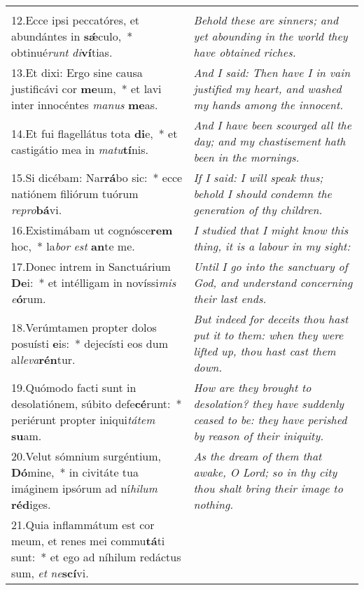 \begin{longtable}{@{\hskip0pt} p{10cm} | p{6cm} @{\hskip0pt}}
{}\\
12.\enspace Ecce ipsi peccatóres, et abundántes in \textbf{s\'{\ae}}culo,~* obtinué\textit{runt} \textit{di}\textbf{ví}tias.
 & \textit{\small Behold these are sinners; and yet abounding in the world they have obtained riches.
}\\
13.\enspace Et dixi: Ergo sine causa justificávi cor \textbf{me}um,~* et lavi inter innocéntes \textit{ma}\textit{nus} \textbf{me}as.
 & \textit{\small And I said: Then have I in vain justified my heart, and washed my hands among the innocent.
}\\
14.\enspace Et fui flagellátus tota \textbf{di}e,~* et castigátio mea in \textit{ma}\textit{tu}\textbf{tí}nis.
 & \textit{\small And I have been scourged all the day; and my chastisement hath been in the mornings.
}\\
15.\enspace Si dicébam: Nar\textbf{rá}bo sic:~* ecce natiónem filiórum tuórum \textit{re}\textit{pro}\textbf{bá}vi.
 & \textit{\small If I said: I will speak thus; behold I should condemn the generation of thy children.
}\\
16.\enspace Existimábam ut cognósce\textbf{rem} hoc,~* la\textit{bor} \textit{est} \textbf{an}te me.
 & \textit{\small I studied that I might know this thing, it is a labour in my sight:
}\\
17.\enspace Donec intrem in Sanctuárium \textbf{De}i:~* et intélligam in novíssi\textit{mis} \textit{e}\textbf{ó}rum.
 & \textit{\small Until I go into the sanctuary of God, and understand concerning their last ends.
}\\
18.\enspace Verúmtamen propter dolos posuísti \textbf{e}is:~* dejecísti eos dum al\textit{le}\textit{va}\textbf{rén}tur.
 & \textit{\small But indeed for deceits thou hast put it to them: when they were lifted up, thou hast cast them down.
}\\
19.\enspace Quómodo facti sunt in desolatiónem, súbito defe\textbf{cé}runt:~* periérunt propter iniqui\textit{tá}\textit{tem} \textbf{su}am.
 & \textit{\small How are they brought to desolation? they have suddenly ceased to be: they have perished by reason of their iniquity.
}\\
20.\enspace Velut sómnium surgéntium, \textbf{Dó}mine,~* in civitáte tua imáginem ipsórum ad ní\textit{hi}\textit{lum} \textbf{réd}iges.
 & \textit{\small As the dream of them that awake, O Lord; so in thy city thou shalt bring their image to nothing.
}\\
21.\enspace Quia inflammátum est cor meum, et renes mei commu\textbf{tá}ti sunt:~* et ego ad níhilum redáctus sum, \textit{et} \textit{ne}\textbf{scí}vi.

\end{longtable}

